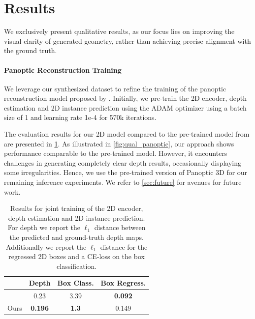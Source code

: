 \section{Results}
\label{sec:results}

We exclusively present qualitative results, as our focus lies on improving the visual clarity of generated geometry, rather than achieving precise alignment with the ground truth.
\vspace*{-4mm}
\paragraph{Panoptic Reconstruction Training}

We leverage our synthesized dataset to refine the training of the panoptic reconstruction model proposed by \citet{dahnert2021panoptic}.
Initially, we pre-train the 2D encoder, depth estimation and 2D instance prediction using the ADAM optimizer \citep{kingma2014adam} using a batch size of 1 and learning rate 1e-4 for 570k iterations.

The evaluation results for our 2D model compared to the pre-trained model from \citet{dahnert2021panoptic} are presented in \cref{tab:2dresults}.
As illustrated in \cref{fig:qual_panoptic}, our approach shows performance comparable to the pre-trained model. However, it encounters challenges in generating completely clear depth results, occasionally displaying some irregularities.
Hence, we use the pre-trained version of Panoptic 3D for our remaining inference experiments. We refer to \cref{sec:future} for avenues for future work.
\begin{table}
  \centering
  \begin{tabular}{@{}lccc@{}}
    \toprule
     & Depth & Box Class. & Box Regress. \\
    \midrule
    \citet{dahnert2021panoptic} & 0.23 & 3.39 & \textbf{0.092}\\
    Ours & \textbf{0.196} & \textbf{1.3} & 0.149 \\
    \bottomrule
  \end{tabular}
  \caption{Results for joint training of the 2D encoder, depth estimation and 2D instance prediction. For depth we report the $\ell_1$ distance between the predicted and ground-truth depth maps. Additionally we report the $\ell_1$ distance for the regressed 2D boxes and a CE-loss on the box classification.  }
  \label{tab:2dresults}
\end{table}


